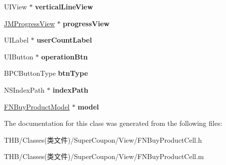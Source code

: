 \begin{DoxyCompactItemize}
\item 
\mbox{\label{interface_f_n_buy_product_cell_a4d284945bd8408821a0496cd6ed2910c}} 
U\+I\+View $\ast$ {\bfseries vertical\+Line\+View}
\item 
\mbox{\label{interface_f_n_buy_product_cell_a322c189b288b92f494da60f011f07964}} 
\mbox{\hyperlink{interface_j_m_progress_view}{J\+M\+Progress\+View}} $\ast$ {\bfseries progress\+View}
\item 
\mbox{\label{interface_f_n_buy_product_cell_aae68a74758e525499226dcc12948090d}} 
U\+I\+Label $\ast$ {\bfseries user\+Count\+Label}
\item 
\mbox{\label{interface_f_n_buy_product_cell_acfe7f7a61bfc018247d7145929e6d5ae}} 
U\+I\+Button $\ast$ {\bfseries operation\+Btn}
\item 
\mbox{\label{interface_f_n_buy_product_cell_ad920642b265725e55789f60798f421f7}} 
B\+P\+C\+Button\+Type {\bfseries btn\+Type}
\item 
\mbox{\label{interface_f_n_buy_product_cell_a72fe01976062178bd1559474799a0cb0}} 
N\+S\+Index\+Path $\ast$ {\bfseries index\+Path}
\item 
\mbox{\label{interface_f_n_buy_product_cell_a4562132ae35f9a807bc936c5f7714906}} 
\mbox{\hyperlink{interface_f_n_buy_product_model}{F\+N\+Buy\+Product\+Model}} $\ast$ {\bfseries model}
\end{DoxyCompactItemize}


The documentation for this class was generated from the following files\+:\begin{DoxyCompactItemize}
\item 
T\+H\+B/\+Classes(类文件)/\+Super\+Coupon/\+View/F\+N\+Buy\+Product\+Cell.\+h\item 
T\+H\+B/\+Classes(类文件)/\+Super\+Coupon/\+View/F\+N\+Buy\+Product\+Cell.\+m\end{DoxyCompactItemize}
